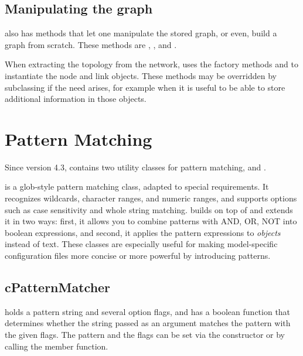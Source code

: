 \subsection{Manipulating the graph}
\label{sec:sim-lib:ctopology-manipulating}

 also has methods that let one manipulate the stored graph,
or even, build a graph from scratch. These methods are ,
,  and .

When extracting the topology from the network,  uses
the factory methods  and  to instantiate
the node and link objects. These methods may be overridden by subclassing
 if the need arises, for example when it is useful to be
able to store additional information in those objects.


\section{Pattern Matching}
\label{sec:sim-lib:pattern-matching}

Since version 4.3, {\opp} contains two utility classes for pattern
matching,  and .

 is a glob-style pattern matching class, adapted to
special {\opp} requirements. It recognizes wildcards, character ranges, and
numeric ranges, and supports options such as case sensitivity and whole
string matching.  builds on top of
 and extends it in two ways: first, it allows you to
combine patterns with AND, OR, NOT into boolean expressions, and second, it
applies the pattern expressions to \textit{objects} instead of text. These
classes are especially useful for making model-specific configuration files
more concise or more powerful by introducing patterns.



\subsection{cPatternMatcher}
\label{sec:sim-lib:cpatternmatcher}

 holds a pattern string and several option flags,
and has a  boolean function that determines whether the
string passed as an argument matches the pattern with the given flags. The
pattern and the flags can be set via the constructor or by calling the
 member function.

